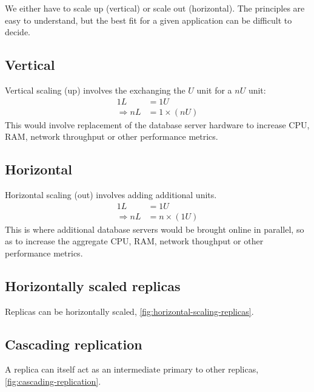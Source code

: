\documentclass[slides]{pgnotes}
\begin{document}
We either have to scale up (vertical) or scale out (horizontal).
The principles are easy to understand, but the best fit for a given application can be difficult to decide.

\subsection{Vertical}

Vertical scaling (up) involves the exchanging the $U$ unit for a $nU$ unit:
\begin{align}
  1 L & = 1 U \\
  \Rightarrow n L & = 1 \times ( n U ) 
\end{align}
This would involve replacement of the database server hardware to increase CPU, RAM, network throughput or other performance metrics.

\subsection{Horizontal}

Horizontal scaling (out) involves adding additional units.
\begin{align}
  1 L & = 1 U \\
  \Rightarrow n L & = n \times ( 1 U ) 
\end{align}
This is where additional database servers would be brought online in parallel, so as to increase the aggregate CPU, RAM, network thoughput or other performance metrics. 

\subsection{Horizontally scaled replicas}

Replicas can be horizontally scaled, \autoref{fig:horizontal-scaling-replicas}.


\subsection{Cascading replication}

A replica can itself act as an intermediate primary to other replicas, \autoref{fig:cascading-replication}.

\end{document}
